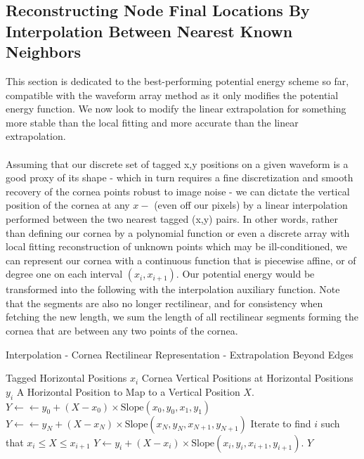 \documentclass[epjST]{svjour}
\begin{document}
\subsection{Reconstructing Node Final Locations By Interpolation Between Nearest Known Neighbors}
This section is dedicated to the best-performing potential energy scheme so far, compatible with the waveform array method as it only modifies the potential energy function. We now look to modify the linear extrapolation for something more stable than the local fitting and more accurate than the linear extrapolation.\\\\
Assuming that our discrete set of tagged x,y positions on a given waveform is a good proxy of its shape - which in turn requires a fine discretization and smooth recovery of the cornea points robust to image noise - we can dictate the vertical position of the cornea at any $x- $ (even off our pixels) by a linear interpolation performed between the two nearest tagged (x,y) pairs. In other words, rather than defining our cornea by a polynomial function or even a discrete array with local fitting reconstruction of unknown points which may be ill-conditioned, we can represent our cornea with a continuous function that is piecewise affine, or of degree one on each interval $(x_i,x_{i+1})$. Our potential energy would be transformed into the following with the interpolation auxiliary function. Note that the segments are also no longer rectilinear, and for consistency when fetching the new length, we sum the length of all rectilinear segments forming the cornea that are between any two points of the cornea.
\begin{algorithm}
    \caption{Interpolation - Cornea Rectilinear Representation - Extrapolation Beyond Edges}
    \label{alg:interp}
    \begin{algorithmic}[1]
        \Require Tagged Horizontal Positions $x_i$
        \Require Cornea Vertical Positions at Horizontal Positions $y_i$
        \Require A Horizontal Position to Map to a Vertical Position $X$.
        \State $Y\gets \gets y_0 + (X-x_0)\times \text{Slope}(x_0,y_0,x_{1}, y_{1})$
        \State $Y\gets \gets y_N + (X-x_N)\times \text{Slope}(x_N,y_N,x_{N+1}, y_{N+1})$
        \EndIf
        \Else
        \State Iterate to find $i$ such that $x_{i}\leq X\leq x_{i+1}$
        \State $Y\gets y_i + (X-x_i)\times \text{Slope}(x_i,y_i,x_{i+1}, y_{i+1})$.
        \EndIf
        \State\Return $Y$
    \end{algorithmic}
\end{algorithm}
\end{document}
